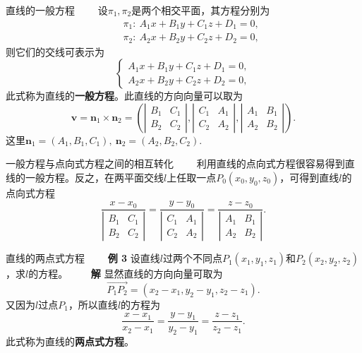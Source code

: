 \documentclass[compress,mathserif,cjk]{beamer}
\theoremstyle{remark}
\numberwithin{equation}{section}
\newcommand{\hei}{\bf}      %
\begin{document}
\begin{CJK}{UTF8}{gbsn}
\begin{frame}{直线的一般方程}
 \ \ \ \ 设$\pi_1,\pi_2$是两个相交平面，其方程分别为
 \begin{eqnarray*}
&&\pi_1:~A_1x+B_1y+C_1z+D_1=0,\\
&&\pi_2:~A_2x+B_2y+C_2z+D_2=0,
\end{eqnarray*}
则它们的交线可表示为
$$\left\{\begin{array}{l}
 A_1x+B_1y+C_1z+D_1=0,\\
 A_2x+B_2y+C_2z+D_2=0,
 \end{array}\right.$$
此式称为直线的{\hei 一般方程}。\pause 此直线的方向向量可以取为
$$\bm v=\bm n_1\times\bm n_2=\left(\left|\begin{matrix}B_1&C_1\\B_2&C_2\end{matrix}\right|,\left|\begin{matrix}C_1&A_1\\C_2&A_2\end{matrix}\right|,
\left|\begin{matrix}A_1&B_1\\A_2&B_2\end{matrix}\right|\right).$$
这里$\bm n_1=(A_1,B_1,C_1),~\bm n_2=(A_2,B_2,C_2).$
\end{frame}

\begin{frame}{一般方程与点向式方程之间的相互转化}
 \ \ \ \ 利用直线的点向式方程很容易得到直线的一般方程。反之，在两平面交线$l$上任取一点$P_0(x_0,y_0,z_0)$，可得到直线$l$的点向式方程
 $$\frac{x-x_0}{\left|\begin{matrix}B_1&C_1\\B_2&C_2\end{matrix}\right|}=\frac{y-y_0}{\left|\begin{matrix}C_1&A_1\\C_2&A_2\end{matrix}\right|}
 =\frac{z-z_0}{\left|\begin{matrix}A_1&B_1\\A_2&B_2\end{matrix}\right|}.$$
\end{frame}

\begin{frame}{直线的两点式方程}
\ \ \ \ {\hei 例 3} 设直线$l$过两个不同点$P_1(x_1,y_1,z_1)$和$P_2(x_2,y_2,z_2)$，求$l$的方程。
 \pause\vskip 5pt
 \ \ \ \ {\hei 解} 显然直线的方向向量可取为
 $$\overset{\longrightarrow}{P_1P_2}=(x_2-x_1,y_2-y_1,z_2-z_1).$$
 又因为$l$过点$P_1$，所以直线$l$的方程为
 $$\frac{x-x_1}{x_2-x_1}=\frac{y-y_1}{y_2-y_1}=\frac{z-z_1}{z_2-z_1}.$$
 此式称为直线的{\hei 两点式方程}。
\end{frame}


\end{CJK}
\end{document}
